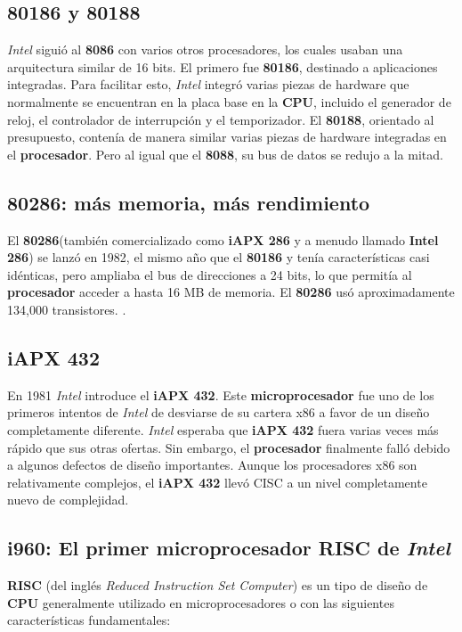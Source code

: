 \subsection{\textbf{80186} y \textbf{80188}}
\emph{Intel} siguió al \textbf{8086} con varios otros procesadores, los cuales usaban una arquitectura similar de 16 bits. El primero fue \textbf{80186}, 
destinado a aplicaciones integradas. Para facilitar esto, \emph{Intel} integró varias piezas de hardware que normalmente se encuentran en la 
placa base en la \textbf{CPU}, incluido el generador de reloj, el controlador de interrupción y el temporizador. El \textbf{80188}, orientado al presupuesto, 
contenía de manera similar varias piezas de hardware integradas en el \textbf{procesador}. Pero al igual que el \textbf{8088}, su bus de datos se redujo a la 
mitad.

\subsection{\textbf{80286}: más memoria, más rendimiento}
El \textbf{80286}(también comercializado como \textbf{iAPX 286} y a menudo llamado \textbf{Intel 286}) se lanzó en 1982, el mismo año que el \textbf{80186} y tenía
características casi idénticas, pero ampliaba el bus de direcciones a 24 bits, lo que permitía al \textbf{procesador} acceder a hasta 16 MB de memoria.
El \textbf{80286} usó aproximadamente 134,000 transistores. .

\subsection{\textbf{iAPX 432}}
En 1981 \emph{Intel}  introduce el \textbf{iAPX 432}. Este \textbf{microprocesador} fue uno de los primeros intentos de \emph{Intel} de desviarse de su cartera x86 a favor de un 
diseño completamente diferente. \emph{Intel} esperaba que \textbf{iAPX 432} fuera varias veces más rápido que sus otras ofertas. Sin embargo, el \textbf{procesador} 
finalmente falló debido a algunos defectos de diseño importantes. Aunque los procesadores x86 son relativamente complejos, el \textbf{iAPX 432} 
llevó CISC a un nivel completamente nuevo de complejidad.

\subsection{\textbf{i960}: El primer \textbf{microprocesador} \textbf{RISC} de \emph{Intel}}
\textbf{RISC} (del inglés \emph{Reduced Instruction Set Computer}) es un tipo de diseño de \textbf{CPU} generalmente utilizado en microprocesadores o 
con las siguientes características fundamentales:

